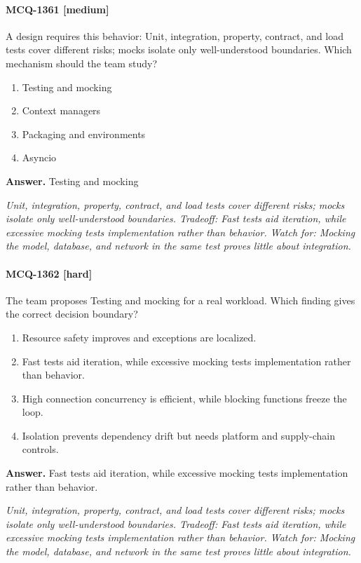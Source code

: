 \paragraph{MCQ-1361 [medium]} A design requires this behavior: Unit, integration, property, contract, and load tests cover different risks; mocks isolate only well-understood boundaries. Which mechanism should the team study?
\begin{enumerate}[label=\Alph*.]
\item Testing and mocking
\item Context managers
\item Packaging and environments
\item Asyncio
\end{enumerate}
\noindent\textbf{Answer.} Testing and mocking
\par\textit{Unit, integration, property, contract, and load tests cover different risks; mocks isolate only well-understood boundaries. Tradeoff: Fast tests aid iteration, while excessive mocking tests implementation rather than behavior. Watch for: Mocking the model, database, and network in the same test proves little about integration.}
\paragraph{MCQ-1362 [hard]} The team proposes Testing and mocking for a real workload. Which finding gives the correct decision boundary?
\begin{enumerate}[label=\Alph*.]
\item Resource safety improves and exceptions are localized.
\item Fast tests aid iteration, while excessive mocking tests implementation rather than behavior.
\item High connection concurrency is efficient, while blocking functions freeze the loop.
\item Isolation prevents dependency drift but needs platform and supply-chain controls.
\end{enumerate}
\noindent\textbf{Answer.} Fast tests aid iteration, while excessive mocking tests implementation rather than behavior.
\par\textit{Unit, integration, property, contract, and load tests cover different risks; mocks isolate only well-understood boundaries. Tradeoff: Fast tests aid iteration, while excessive mocking tests implementation rather than behavior. Watch for: Mocking the model, database, and network in the same test proves little about integration.}
